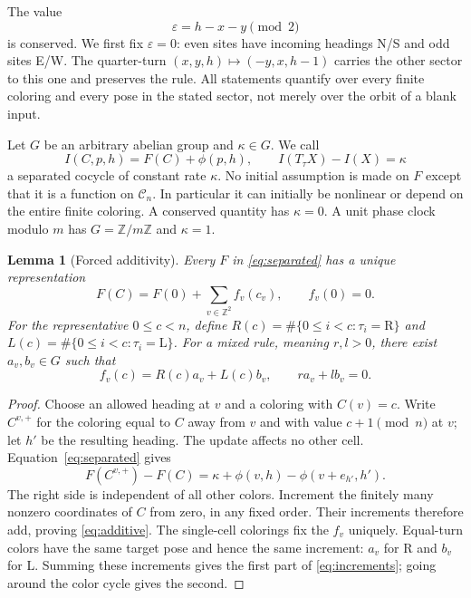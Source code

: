 \documentclass[11pt]{article}
\newtheorem{lemma}[theorem]{Lemma}
\theoremstyle{definition}
\newcommand{\Z}{\mathbb Z}
\newcommand{\R}{\mathrm R}
\newcommand{\Lturn}{\mathrm L}
\newcommand{\tape}{\mathcal C_n}
\newcommand{\eps}{\varepsilon}
\begin{document}
The value
\[
 \eps=h-x-y\pmod2
\]
is conserved. We first fix $\eps=0$: even sites have incoming headings N/S
and odd sites E/W. The quarter-turn $(x,y,h)\mapsto(-y,x,h-1)$ carries the other
sector to this one and preserves the rule. All statements quantify over every
finite coloring and every pose in the stated sector, not merely over the orbit
of a blank input.

Let $G$ be an arbitrary abelian group and $\kappa\in G$. We call
\begin{equation}\label{eq:separated}
 I(C,p,h)=F(C)+\phi(p,h),\qquad
 I(T_\tau X)-I(X)=\kappa
\end{equation}
a separated cocycle of constant rate $\kappa$. No initial assumption is made
on $F$ except that it is a function on $\tape$. In particular it can initially
be nonlinear or depend on the entire finite coloring. A conserved quantity has
$\kappa=0$. A unit phase clock modulo $m$ has $G=\Z/m\Z$ and $\kappa=1$.

\begin{lemma}[Forced additivity]\label{lem:additive}
Every $F$ in \eqref{eq:separated} has a unique representation
\begin{equation}\label{eq:additive}
 F(C)=F(0)+\sum_{v\in\Z^2} f_v(c_v),\qquad f_v(0)=0.
\end{equation}
For the representative $0\le c<n$, define
$R(c)=\#\{0\le i<c:\tau_i=\R\}$ and
$L(c)=\#\{0\le i<c:\tau_i=\Lturn\}$.
For a mixed rule, meaning $r,l>0$, there exist $a_v,b_v\in G$ such that
\begin{equation}\label{eq:increments}
 f_v(c)=R(c)a_v+L(c)b_v,\qquad r a_v+l b_v=0.
\end{equation}
\end{lemma}
\begin{proof}
Choose an allowed heading at $v$ and a coloring with $C(v)=c$.
Write $C^{v,+}$ for the coloring equal to $C$ away from $v$ and with value
$c+1\pmod n$ at $v$; let $h'$ be the resulting heading. The update affects
no other cell. Equation~\eqref{eq:separated} gives
\[
 F(C^{v,+})-F(C)=\kappa+\phi(v,h)-\phi(v+e_{h'},h').
\]
The right side is independent of all other colors. Increment the finitely
many nonzero coordinates of $C$ from zero, in any fixed order. Their increments
therefore add, proving \eqref{eq:additive}. The single-cell colorings fix the
$f_v$ uniquely. Equal-turn colors have the same target pose and hence the same
increment: $a_v$ for R and $b_v$ for L. Summing these increments gives the first
part of \eqref{eq:increments}; going around the color cycle gives the second.
\end{proof}
\end{document}
